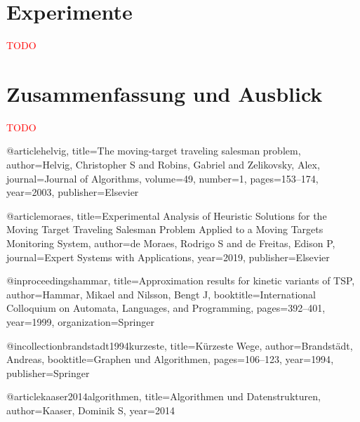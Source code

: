 \documentclass[german,version-2019-11]{uzl-thesis}
\begin{document}
\chapter{Experimente}
\textcolor{red}{TODO}

\chapter{Zusammenfassung und Ausblick}
\textcolor{red}{TODO}



\begin{bibtex-entries}
@article{helvig,
  title={The moving-target traveling salesman problem},
  author={Helvig, Christopher S and Robins, Gabriel and Zelikovsky, Alex},
  journal={Journal of Algorithms},
  volume={49},
  number={1},
  pages={153--174},
  year={2003},
  publisher={Elsevier}
}

@article{moraes,
  title={Experimental Analysis of Heuristic Solutions for the Moving Target Traveling Salesman Problem Applied to a Moving Targets Monitoring System},
  author={de Moraes, Rodrigo S and de Freitas, Edison P},
  journal={Expert Systems with Applications},
  year={2019},
  publisher={Elsevier}
}

@inproceedings{hammar,
  title={Approximation results for kinetic variants of TSP},
  author={Hammar, Mikael and Nilsson, Bengt J},
  booktitle={International Colloquium on Automata, Languages, and Programming},
  pages={392--401},
  year={1999},
  organization={Springer}
}

@incollection{brandstadt1994kurzeste,
  title={K{\"u}rzeste Wege},
  author={Brandst{\"a}dt, Andreas},
  booktitle={Graphen und Algorithmen},
  pages={106--123},
  year={1994},
  publisher={Springer}
}

@article{kaaser2014algorithmen,
  title={Algorithmen und Datenstrukturen},
  author={Kaaser, Dominik S},
  year={2014}
}
\end{bibtex-entries}



%
%
%
%
\end{document}
